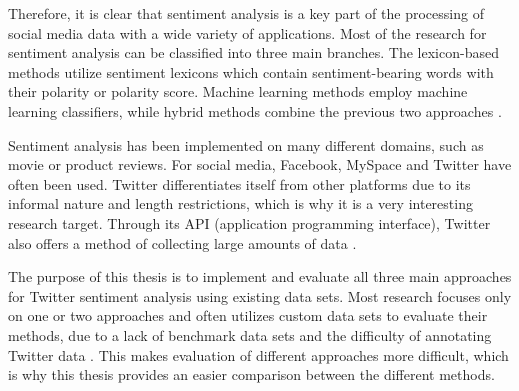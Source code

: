 Therefore, it is clear that sentiment analysis is a key part of the processing of social media data with a wide variety of applications. Most of the research for sentiment analysis can be classified into three main branches. The lexicon-based methods utilize sentiment lexicons which contain sentiment-bearing words with their polarity or polarity score. Machine learning methods employ machine learning classifiers, while hybrid methods combine the previous two approaches \cite{MEDHAT20141093}.

Sentiment analysis has been implemented on many different domains, such as movie or product reviews. For social media, Facebook, MySpace and Twitter have often been used. Twitter differentiates itself from other platforms due to its informal nature and length restrictions, which is why it is a very interesting research target. Through its API (application programming interface), Twitter also offers a method of collecting large amounts of data \cite{DBLP:journals/csur/GiachanouC16}.

The purpose of this thesis is to implement and evaluate all three main approaches for Twitter sentiment analysis using existing data sets. Most research focuses only on one or two approaches and often utilizes custom data sets to evaluate their methods, due to a lack of benchmark data sets and the difficulty of annotating Twitter data \cite{DBLP:journals/csur/GiachanouC16}. This makes evaluation of different approaches more difficult, which is why this thesis provides an easier comparison between the different methods.




